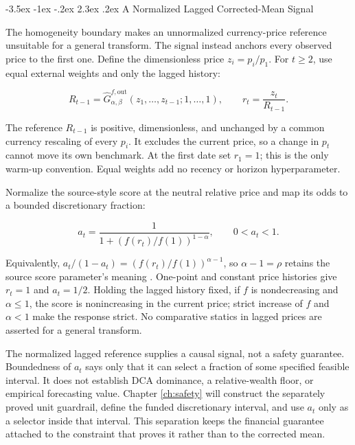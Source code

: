 \documentclass[12pt,a4paper,oneside]{report}
\makeatletter
\renewcommand\section{\@startsection{section}{1}{\z@}%
  {-3.5ex \@plus -1ex \@minus -.2ex}%
  {2.3ex \@plus .2ex}%
  {\normalfont\fontsize{14}{17}\selectfont\bfseries}}
\makeatother
\begin{document}
\section{A Normalized Lagged Corrected-Mean Signal}
\label{sec:corrected-signal}

The homogeneity boundary makes an unnormalized currency-price reference
unsuitable for a general transform. The signal instead anchors every observed
price to the first one. Define the dimensionless price $z_i=p_i/p_1$. For
$t\geq2$, use equal external weights and only the lagged history:

\begin{equation}
  R_{t-1}
  =\widehat G_{\alpha,\beta}^{f,\mathrm{out}}
    (z_1,\ldots,z_{t-1};1,\ldots,1),
  \qquad
  r_t=\frac{z_t}{R_{t-1}}.
  \label{eq:corrected-reference}
\end{equation}

The reference $R_{t-1}$ is positive, dimensionless, and unchanged by a common
currency rescaling of every $p_i$. It excludes the current price, so a change
in $p_t$ cannot move its own benchmark. At the first date set $r_1=1$; this is
the only warm-up convention. Equal weights add no recency or horizon
hyperparameter.

Normalize the source-style score at the neutral relative price and map its
odds to a bounded discretionary fraction:

\begin{equation}
  a_t
  =\frac{1}{1+\left(f(r_t)/f(1)\right)^{1-\alpha}},
  \qquad 0<a_t<1.
  \label{eq:corrected-score}
\end{equation}

Equivalently,
$a_t/(1-a_t)=(f(r_t)/f(1))^{\alpha-1}$, so
$\alpha-1=\rho$ retains the source score parameter's meaning
\citep{calvet2023smartdca}. One-point and constant price histories give
$r_t=1$ and $a_t=1/2$. Holding the lagged history fixed, if $f$ is
nondecreasing and $\alpha\leq1$, the score is nonincreasing in the current
price; strict increase of $f$ and $\alpha<1$ make the response strict. No
comparative statics in lagged prices are asserted for a general transform.

The normalized lagged reference supplies a causal signal, not a safety
guarantee. Boundedness of $a_t$ says only that it can select a fraction of some
specified feasible interval. It does not establish DCA dominance, a
relative-wealth floor, or empirical forecasting value. Chapter \ref{ch:safety} will
construct the separately proved unit guardrail, define the funded
discretionary interval, and use $a_t$ only as a selector inside that interval.
This separation keeps the financial guarantee attached to the constraint that
proves it rather than to the corrected mean.
\end{document}
